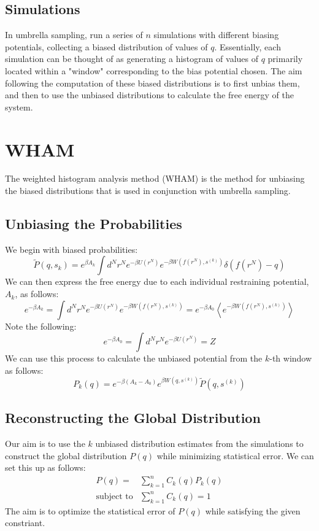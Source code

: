 \documentclass{article}
\begin{document}
\subsection{Simulations}
In umbrella sampling, run a series of $n$ simulations with different biasing potentials, collecting a biased distribution of values of $q$.
Essentially, each simulation can be thought of as generating a histogram of values of $q$ primarily located within a "window" corresponding to the bias potential chosen.
The aim following the computation of these biased distributions is to first unbias them, and then to use the unbiased distributions to calculate the free energy of the system.

\section{WHAM}
The weighted histogram analysis method (WHAM) is the method for unbiasing the biased distributions that is used in conjunction with umbrella sampling.

\subsection{Unbiasing the Probabilities}
We begin with biased probabilities:
$$\tilde{P}(q, s_k) = e^{\beta A_k} \int d^N r^N e^{-\beta U(r^N)} e^{- \beta W(f(r^N), s^{(k)})}\delta(f(r^N) - q)$$
We can then express the free energy due to each individual restraining potential, $A_k$, as follows:
$$e^{-\beta A_k} = \int d^N r^N e^{-\beta U(r^N)} e^{-\beta W(f(r^N), s^{(k)})} = e^{-\beta A_0} \left \langle e^{- \beta W(f(r^N), s^{(k)})} \right \rangle$$
Note the following:
$$e^{-\beta A_0} = \int d^N r^N e^{-\beta U(r^N)} = Z$$
We can use this process to calculate the unbiased potential from the $k$-th window as follows:
$$ P_k(q) = e^{-\beta(A_k - A_0)} e^{\beta W\left(q, s^{(k)}\right)} \tilde{P}(q, s^{(k)}) $$

\subsection{Reconstructing the Global Distribution}
Our aim is to use the $k$ unbiased distribution estimates from the simulations to construct the global distribution $P(q)$ while minimizing statistical error.
We can set this up as follows:
\begin{align*}
    P(q) = &\sum_{k=1}^n C_k(q) P_k(q)\\
    \text{subject to} &\sum_{k=1}^n C_k(q) = 1
\end{align*}
The aim is to optimize the statistical error of $P(q)$ while satisfying the given constriant.
\end{document}
